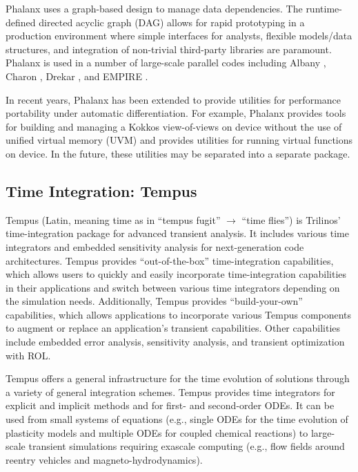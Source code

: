 Phalanx uses a graph-based design to manage data dependencies. The runtime-defined directed acyclic graph (DAG) allows for rapid prototyping in a production environment where simple interfaces for analysts, flexible models/data structures, and integration of non-trivial third-party libraries are paramount. Phalanx is used in a number of large-scale parallel codes including Albany \cite{Salinger2016}, Charon \cite{CharonUsersManual2020}, Drekar \cite{Crockatt2022,Miller2019,Shadid2016mhd}, and EMPIRE \cite{BettencourtBrownEtAl2021_EmpirePic}.

In recent years, Phalanx has been extended to provide utilities for performance portability under automatic differentiation. For example, Phalanx provides tools for building and managing a Kokkos view-of-views on device without the use of unified virtual memory (UVM) and provides utilities for running virtual functions on device. In the future, these utilities may be separated into a separate package.

\subsection{Time Integration: Tempus}
Tempus (Latin, meaning time as in ``tempus fugit'' $\rightarrow$ ``time flies'') is Trilinos' time-integration package for advanced transient
analysis. It includes various time integrators and embedded
sensitivity analysis for next-generation code architectures.  Tempus
provides ``out-of-the-box'' time-integration capabilities, which
allows users to quickly and easily incorporate time-integration
capabilities in their applications and switch between various time
integrators depending on the simulation needs.  Additionally, Tempus
provides ``build-your-own'' capabilities, which allows applications
to incorporate various Tempus components to augment or replace
an application's transient capabilities. Other capabilities include
embedded error analysis, sensitivity analysis, and transient optimization
with ROL.

Tempus offers a general infrastructure for the time evolution of
solutions through a variety of general integration schemes.  Tempus
provides time integrators for explicit and implicit methods and for
first- and second-order ODEs.  It can be used from small systems of
equations (e.g., single ODEs for the time evolution of plasticity
models and multiple ODEs for coupled chemical reactions) to
large-scale transient simulations requiring exascale computing
(e.g., flow fields around reentry vehicles and magneto-hydrodynamics).

